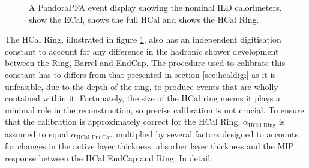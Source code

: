 \begin{figure}
\caption[A PandoraPFA event display showing the nominal ILD calorimeters.  \protect{} show the ECal, \protect{} shows the full HCal and \protect{} shows the HCal Ring.]{A PandoraPFA event display showing the nominal ILD calorimeters.  \protect{} show the ECal, \protect{} shows the full HCal and \protect{} shows the HCal Ring.}
\label{fig:calorimeters}
\end{figure}

The HCal Ring, illustrated in figure \ref{fig:calorimeters}, also has an independent digitisation constant to account for any difference in the hadronic shower development between the Ring, Barrel and EndCap.  The procedure used to calibrate this constant has to differs from that presented in section \ref{sec:hcaldigi} as it is unfeasible, due to the depth of the ring, to produce events that are wholly contained within it.  Fortunately, the size of the HCal ring means it plays a minimal role in the reconstruction, so precise calibration is not crucial.  To ensure that the calibration is approximately correct for the HCal Ring, $\alpha_{\text{HCal Ring}}$ is assumed to equal $\alpha_{\text{HCal EndCap}}$ multiplied by several factors designed to accounts for changes in the active layer thickness, absorber layer thickness and the MIP response between the HCal EndCap and Ring.  In detail:

